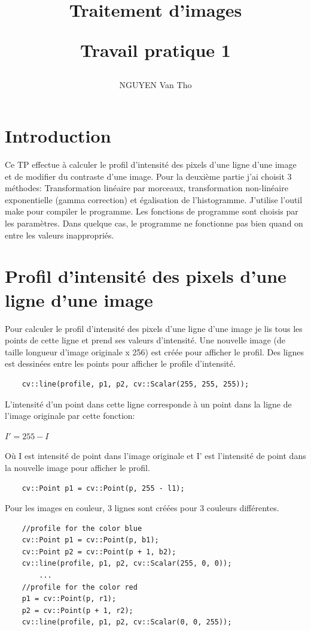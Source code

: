 \documentclass[paper=a4, fontsize=11pt]{scrartcl}	%
\title{ \vspace{-1in} \usefont{OT1}{bch}{b}{n}		
		\Huge \bfseries \strut Traitement d'images\\
		\Large \bfseries \strut Travail pratique 1
}
\author{
		\usefont{OT1}{bch}{m}{n}
        NGUYEN Van Tho
}
\date{}
\begin{document}
\maketitle
\section{Introduction}
Ce TP effectue à calculer le profil d'intensité des pixels d'une ligne d’une image et de modifier du contraste d’une image. Pour la deuxième partie j'ai choisit 3 méthodes: Transformation linéaire par morceaux, transformation non-linéaire exponentielle (gamma correction) et égalisation de l'histogramme.
J'utilise l'outil make pour compiler le programme. Les fonctions de programme sont choisis par les paramètres. Dans quelque cas, le programme ne fonctionne pas bien quand on entre les valeurs inappropriés.

\section{Profil d'intensité des pixels d'une ligne d’une image}
Pour calculer le profil d'intensité des pixels d'une ligne d’une image je lis tous les points de cette ligne et prend ses valeurs d'intensité.
Une nouvelle image (de taille longueur d'image originale x 256) est créée pour afficher le profil. Des lignes est dessinées entre les points pour afficher le profile d'intensité. 
\begin{lstlisting}
    cv::line(profile, p1, p2, cv::Scalar(255, 255, 255));
\end{lstlisting}
L'intensité d'un point dans cette ligne corresponde à un point dans la ligne de l'image originale par cette fonction:
\begin{center}
$I' = 255 - I$
\end{center}
Où I est intensité de point dans l'image originale et I' est l'intensité de point dans la nouvelle image pour afficher le profil.

\begin{lstlisting}
    cv::Point p1 = cv::Point(p, 255 - l1);
\end{lstlisting}

Pour les images en couleur, 3 lignes sont créées pour 3 couleurs différentes.  
\begin{lstlisting}
    //profile for the color blue
    cv::Point p1 = cv::Point(p, b1);
    cv::Point p2 = cv::Point(p + 1, b2);
    cv::line(profile, p1, p2, cv::Scalar(255, 0, 0));
 		...
    //profile for the color red 
    p1 = cv::Point(p, r1);
    p2 = cv::Point(p + 1, r2);
    cv::line(profile, p1, p2, cv::Scalar(0, 0, 255));
\end{lstlisting}
\end{document}
